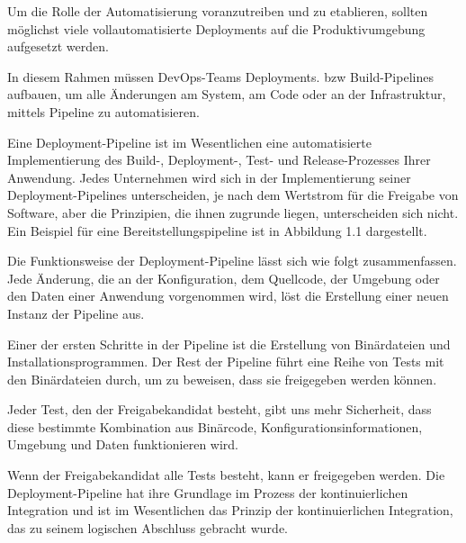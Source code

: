 Um die Rolle der Automatisierung voranzutreiben und zu etablieren, sollten möglichst viele vollautomatisierte Deployments auf die Produktivumgebung aufgesetzt werden.   

In diesem Rahmen müssen DevOps-Teams Deployments. bzw Build-Pipelines aufbauen, um alle Änderungen am System, am Code oder an der Infrastruktur, mittels Pipeline zu automatisieren. 










Eine Deployment-Pipeline ist im Wesentlichen eine automatisierte Implementierung des Build-, Deployment-, Test- und Release-Prozesses Ihrer Anwendung. Jedes Unternehmen wird sich in der Implementierung seiner Deployment-Pipelines unterscheiden, je nach dem Wertstrom für die Freigabe von Software, aber die Prinzipien, die ihnen zugrunde liegen, unterscheiden sich nicht. Ein Beispiel für eine Bereitstellungspipeline ist in Abbildung 1.1 dargestellt.



Die Funktionsweise der Deployment-Pipeline lässt sich wie folgt zusammenfassen. Jede Änderung, die an der Konfiguration, dem Quellcode, der Umgebung oder den Daten einer Anwendung vorgenommen wird, löst die Erstellung einer neuen Instanz der Pipeline aus. 

Einer der ersten Schritte in der Pipeline ist die Erstellung von Binärdateien und Installationsprogrammen. Der Rest der Pipeline führt eine Reihe von Tests mit den Binärdateien durch, um zu beweisen, dass sie freigegeben werden können. 

Jeder Test, den der Freigabekandidat besteht, gibt uns mehr Sicherheit, dass diese bestimmte Kombination aus Binärcode, Konfigurationsinformationen, Umgebung und Daten funktionieren wird. 

Wenn der Freigabekandidat alle Tests besteht, kann er freigegeben werden. Die Deployment-Pipeline hat ihre Grundlage im Prozess der kontinuierlichen Integration und ist im Wesentlichen das Prinzip der kontinuierlichen Integration, das zu seinem logischen Abschluss gebracht wurde. 



